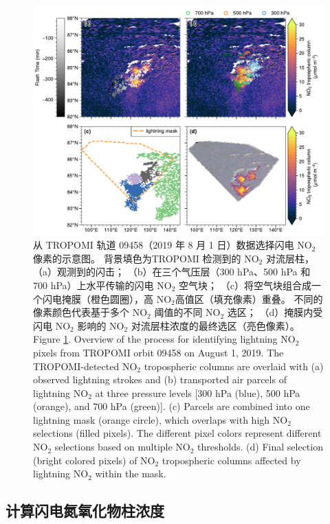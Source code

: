 \begin{figure}[!htbp]
\centering
\includegraphics[width=14cm]{./figures/arctic_workflow.pdf}
\caption{
从 TROPOMI 轨道 09458（2019 年 8 月 1 日）数据选择闪电 NO$_2$ 像素的示意图。
背景填色为TROPOMI 检测到的 NO$_2$ 对流层柱，
（a）观测到的闪击；
（b）在三个气压层（300 hPa、500 hPa 和 700 hPa）上水平传输的闪电 NO$_2$ 空气块；
（c）将空气块组合成一个闪电掩膜（橙色圆圈），高 NO$_2$高值区（填充像素）重叠。
不同的像素颜色代表基于多个 NO$_2$ 阈值的不同 NO$_2$ 选区；
（d）掩膜内受闪电 NO$_2$ 影响的 NO$_2$ 对流层柱浓度的最终选区（亮色像素）。\\
Figure \ref{fig:workflow}. Overview of the process for identifying lightning NO$_2$ pixels from TROPOMI orbit 09458 on August 1, 2019.
The TROPOMI-detected NO$_2$ tropospheric columns are overlaid with (a) observed lightning strokes and
(b) transported air parcels of lightning NO$_2$ at three pressure levels [300 hPa (blue), 500 hPa (orange), and 700 hPa (green)].
(c) Parcels are combined into one lightning mask (orange circle), which overlaps with high NO$_2$ selections (filled pixels). The different pixel colors represent different NO$_2$ selections based on multiple NO$_2$ thresholds.
(d) Final selection (bright colored pixels) of NO$_2$ tropospheric columns affected by lightning NO$_2$ within the mask.
}
\label{fig:workflow}
\end{figure}

\subsection*{计算闪电氮氧化物柱浓度}

